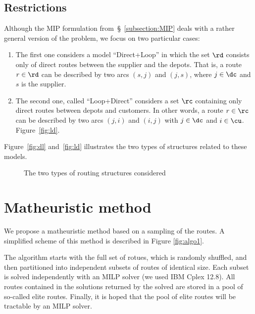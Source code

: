 \documentclass[a4paper,10pt]{article}
\begin{document}
\begin{linenumbers}
\subsection{Restrictions}
Although the MIP formulation from~\S~\ref{subsection:MIP} deals with a rather general version of the problem, we focus on two particular cases:
\begin{enumerate}
    \item The first one considers a model ``Direct+Loop'' in which the set $\rd$ consists only of direct routes between the supplier and the depots. 
        That is, a route $r\in\rd$ can be described by two arcs $(s,j)$ and $(j,s)$, where $j\in\dc$ and $s$ is the supplier.
    \item The second one, called ``Loop+Direct'' considers a set $\rc$ containing only direct routes between depots and customers. 
        In other words, a route $r\in\rc$ can be described by two arcs $(j,i)$ and $(i,j)$ with $j\in\dc$ and $i\in\cu$. Figure~\ref{fig:ld}.
\end{enumerate}
Figure~\ref{fig:dl} and~\ref{fig:ld} illustrates the two types of structures related to these models.
\begin{figure}
    \centering
    \caption{The two types of routing structures considered}
\end{figure}


\section{Matheuristic method} 
\label{sec:algo}

We propose a matheuristic method based on a sampling of the routes. 
A simplified scheme of this method is described in Figure \ref{fig:algo1}. 

The algorithm starts with the full set of rotues, which is randomly shuffled, and then partitioned into independent subsets of routes of identical size. Each subset is solved independently with an MILP solver (we used IBM Cplex 12.8). All routes contained in the solutions returned by the solved are stored in a pool of so-called elite routes. 
Finally, it is hoped that the pool of elite routes will be tractable by an MILP solver. 

\begin{figure}[htbp]
	\centering
	\begin{tikzpicture}[scale=0.8, auto,swap]
	

\end{tikzpicture}
\end{figure}
\end{linenumbers}
\end{document}

